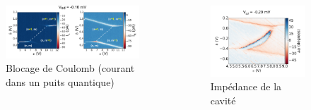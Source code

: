 \documentclass[10pt,a9paper,handout]{beamer} \usepackage[utf8]{inputenc} \usepackage[francais]{babel} \usepackage[T1]{fontenc}
\begin{document}
\begin{frame}
\begin{columns}[T]
\begin{column}{0.65\textwidth}
\begin{figure}[h]
    \begin{center}
        \includegraphics[width=\textwidth]{Images/Exp/CoulombBlockade}
        \caption{Blocage de Coulomb (courant dans un puits quantique)}
    \end{center}
\end{figure}
\end{column}
\begin{column}{0.35\textwidth}
\begin{figure}[h]
    \begin{center}
        \includegraphics[width=\textwidth]{Images/Sweep/20150422_multigrayscale_DeltaEpsilon_001VsdmV_010__grayscale_phase}
        \caption{Impédance de la cavité}
    \end{center}
\end{figure}
\end{column}
\end{columns}

\end{frame}
\end{document}
